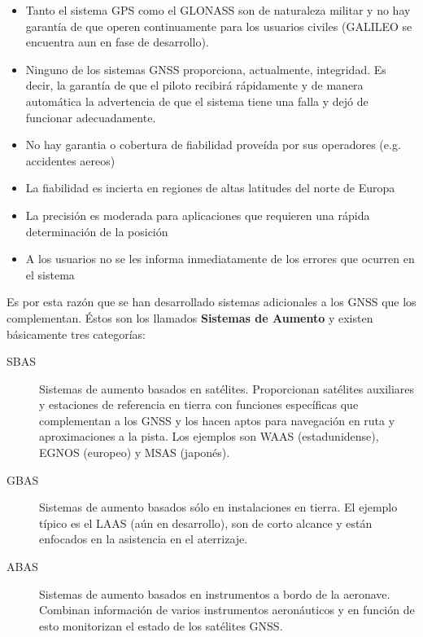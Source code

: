 \documentclass[a4paper,12pt,twoside]{article}
\begin{document}
\begin{itemize}
\item  Tanto el sistema GPS como el GLONASS son de
  naturaleza militar y no hay garant\'ia de que operen continuamente
  para los usuarios civiles (GALILEO se encuentra aun en fase de
  desarrollo).

\item  Ninguno de los sistemas GNSS proporciona,  actualmente, integridad. Es decir, la garant\'ia de que el piloto
  recibir\'a r\'apidamente y de manera autom\'atica la advertencia de que el
  sistema tiene una falla y dej\'o de funcionar adecuadamente.

\item  No hay garantia o cobertura de fiabilidad prove\'ida por sus operadores (e.g. accidentes aereos)
\item La fiabilidad es incierta en regiones de altas latitudes del norte de Europa
\item La precisi\'on es moderada para aplicaciones que requieren una r\'apida determinaci\'on de la posici\'on
\item A los usuarios no se les informa inmediatamente de los errores que ocurren en el sistema
\end{itemize}

Es por esta raz\'on que se han desarrollado sistemas adicionales a los GNSS que los complementan. \'Estos son los llamados \textbf{Sistemas de Aumento} y existen b\'asicamente tres categor\'ias:


\begin{description}
\item [SBAS] Sistemas de aumento basados en sat\'elites. Proporcionan sat\'elites auxiliares y estaciones de referencia en tierra con funciones espec\'ificas que complementan a los GNSS y los hacen aptos
  para navegaci\'on en ruta y aproximaciones a la pista. Los ejemplos
  son WAAS (estadunidense), EGNOS (europeo) y MSAS (japon\'es).

\item [GBAS] Sistemas de aumento basados s\'olo en instalaciones en
  tierra. El ejemplo t\'ipico es el LAAS (a\'un en desarrollo), son de
  corto alcance y est\'an enfocados en la asistencia en el aterrizaje.

\item [ABAS] Sistemas de aumento basados en instrumentos a bordo de la
  aeronave. Combinan informaci\'on de varios instrumentos aeron\'auticos y
  en funci\'on de esto monitorizan el estado de los sat\'elites GNSS.
\end{description}
\end{document}
